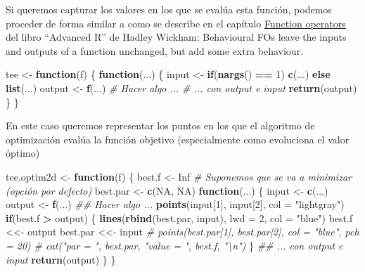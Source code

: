 \documentclass[
]{book}
\newenvironment{Shaded}{\begin{snugshade}}{\end{snugshade}}
\newcommand{\CommentTok}[1]{\textcolor[rgb]{0.56,0.35,0.01}{\textit{#1}}}
\newcommand{\ControlFlowTok}[1]{\textcolor[rgb]{0.13,0.29,0.53}{\textbf{#1}}}
\newcommand{\DataTypeTok}[1]{\textcolor[rgb]{0.13,0.29,0.53}{#1}}
\newcommand{\DecValTok}[1]{\textcolor[rgb]{0.00,0.00,0.81}{#1}}
\newcommand{\KeywordTok}[1]{\textcolor[rgb]{0.13,0.29,0.53}{\textbf{#1}}}
\newcommand{\NormalTok}[1]{#1}
\newcommand{\OperatorTok}[1]{\textcolor[rgb]{0.81,0.36,0.00}{\textbf{#1}}}
\newcommand{\OtherTok}[1]{\textcolor[rgb]{0.56,0.35,0.01}{#1}}
\newcommand{\StringTok}[1]{\textcolor[rgb]{0.31,0.60,0.02}{#1}}
\theoremstyle{break}
\theoremstyle{definition}
\theoremstyle{definition}
\theoremstyle{definition}
\theoremstyle{remark}
\begin{document}
Si queremos capturar los valores en los que se evalúa esta función,
podemos proceder de forma similar a como se describe en el capítulo
\href{http://adv-r.had.co.nz/Function-operators.html\#behavioural-fos}{Function operators}
del libro ``Advanced R'' de Hadley Wickham:
Behavioural FOs leave the inputs and outputs of a function unchanged,
but add some extra behaviour.

\begin{Shaded}
\begin{Highlighting}[]
\NormalTok{tee <-}\StringTok{ }\ControlFlowTok{function}\NormalTok{(f) \{}
  \ControlFlowTok{function}\NormalTok{(...) \{}
\NormalTok{    input <-}\StringTok{ }\ControlFlowTok{if}\NormalTok{(}\KeywordTok{nargs}\NormalTok{() }\OperatorTok{==}\StringTok{ }\DecValTok{1}\NormalTok{) }\KeywordTok{c}\NormalTok{(...) }\ControlFlowTok{else} \KeywordTok{list}\NormalTok{(...)}
\NormalTok{    output <-}\StringTok{ }\KeywordTok{f}\NormalTok{(...)}
    \CommentTok{# Hacer algo ...}
    \CommentTok{# ... con output e input}
    \KeywordTok{return}\NormalTok{(output)}
\NormalTok{  \}}
\NormalTok{\}}
\end{Highlighting}
\end{Shaded}

En este caso queremos representar los puntos en los que el algoritmo de optimización
evalúa la función objetivo (especialmente como evoluciona el valor óptimo)

\begin{Shaded}
\begin{Highlighting}[]
\NormalTok{tee.optim2d <-}\StringTok{ }\ControlFlowTok{function}\NormalTok{(f) \{}
\NormalTok{  best.f <-}\StringTok{ }\OtherTok{Inf}   \CommentTok{# Suponemos que se va a minimizar (opción por defecto)}
\NormalTok{  best.par <-}\StringTok{ }\KeywordTok{c}\NormalTok{(}\OtherTok{NA}\NormalTok{, }\OtherTok{NA}\NormalTok{)   }
  \ControlFlowTok{function}\NormalTok{(...) \{}
\NormalTok{    input <-}\StringTok{ }\KeywordTok{c}\NormalTok{(...)}
\NormalTok{    output <-}\StringTok{ }\KeywordTok{f}\NormalTok{(...)}
    \CommentTok{## Hacer algo ...}
    \KeywordTok{points}\NormalTok{(input[}\DecValTok{1}\NormalTok{], input[}\DecValTok{2}\NormalTok{], }\DataTypeTok{col =} \StringTok{"lightgray"}\NormalTok{)}
    \ControlFlowTok{if}\NormalTok{(best.f }\OperatorTok{>}\StringTok{ }\NormalTok{output) \{}
      \KeywordTok{lines}\NormalTok{(}\KeywordTok{rbind}\NormalTok{(best.par, input), }\DataTypeTok{lwd =} \DecValTok{2}\NormalTok{, }\DataTypeTok{col =} \StringTok{"blue"}\NormalTok{)}
\NormalTok{      best.f <<-}\StringTok{ }\NormalTok{output}
\NormalTok{      best.par <<-}\StringTok{ }\NormalTok{input}
      \CommentTok{# points(best.par[1], best.par[2], col = "blue", pch = 20)}
      \CommentTok{# cat("par = ", best.par, "value = ", best.f, "\textbackslash{}n")}
\NormalTok{    \} }
    \CommentTok{## ... con output e input}
    \KeywordTok{return}\NormalTok{(output)}
\NormalTok{  \}}
\NormalTok{\}}
\end{Highlighting}
\end{Shaded}
\end{document}
